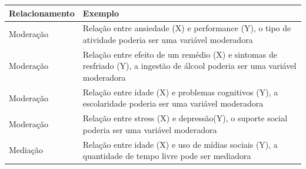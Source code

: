 \documentclass[
]{book}
\begin{document}
\begin{longtable}[]{@{}ll@{}}
\toprule
\begin{minipage}[b]{0.10\columnwidth}\raggedright
Relacionamento\strut
\end{minipage} & \begin{minipage}[b]{0.84\columnwidth}\raggedright
Exemplo\strut
\end{minipage}\tabularnewline
\midrule
\endhead
\begin{minipage}[t]{0.10\columnwidth}\raggedright
Moderação\strut
\end{minipage} & \begin{minipage}[t]{0.84\columnwidth}\raggedright
Relação entre ansiedade (X) e performance (Y), o tipo de atividade poderia ser uma variável moderadora\strut
\end{minipage}\tabularnewline
\begin{minipage}[t]{0.10\columnwidth}\raggedright
Moderação\strut
\end{minipage} & \begin{minipage}[t]{0.84\columnwidth}\raggedright
Relação entre efeito de um remédio (X) e sintomas de resfriado (Y), a ingestão de álcool poderia ser uma variável moderadora\strut
\end{minipage}\tabularnewline
\begin{minipage}[t]{0.10\columnwidth}\raggedright
Moderação\strut
\end{minipage} & \begin{minipage}[t]{0.84\columnwidth}\raggedright
Relação entre idade (X) e problemas cognitivos (Y), a escolaridade poderia ser uma variável moderadora\strut
\end{minipage}\tabularnewline
\begin{minipage}[t]{0.10\columnwidth}\raggedright
Moderação\strut
\end{minipage} & \begin{minipage}[t]{0.84\columnwidth}\raggedright
Relação entre stress (X) e depressão(Y), o suporte social poderia ser uma variável moderadora\strut
\end{minipage}\tabularnewline
\begin{minipage}[t]{0.10\columnwidth}\raggedright
Mediação\strut
\end{minipage} & \begin{minipage}[t]{0.84\columnwidth}\raggedright
Relação entre idade (X) e uso de mídias sociais (Y), a quantidade de tempo livre pode ser mediadora\strut
\end{minipage}\tabularnewline

\end{longtable}
\end{document}
